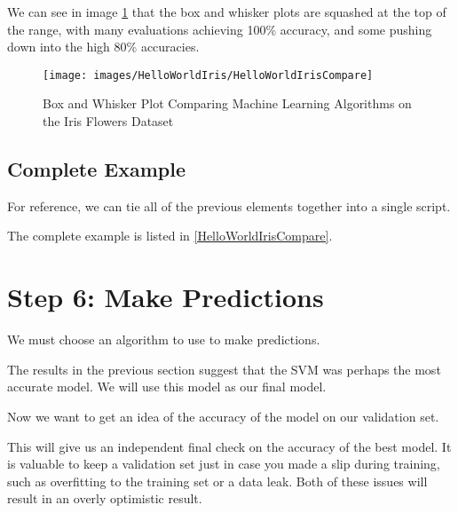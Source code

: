 We can see in image \ref{HelloWorldIrisComparePlot} that the box and whisker plots are squashed at the top of the range, with many evaluations achieving 100\% accuracy, and some pushing down into the high 80\% accuracies.
    
\begin{figure}
    \centering
    
    \texttt{[image: images/HelloWorldIris/HelloWorldIrisCompare]}
    
    \caption{Box and Whisker Plot Comparing Machine Learning Algorithms on the Iris Flowers Dataset}\label{HelloWorldIrisComparePlot}
\end{figure}    

    
\subsection{Complete Example}

For reference, we can tie all of the previous elements together into a single script.
    
The complete example is listed in \ref{HelloWorldIrisCompare}.

\begin{code}
      
    
  \caption{Example ``Hello World Iris'' - Scatter Plot Matrix} \label{HelloWorldIrisCompare}
\end{code}      
   
                

\section{Step 6: Make Predictions}

We must choose an algorithm to use to make predictions.
    
The results in the previous section suggest that the SVM was perhaps the most accurate model. We will use this model as our final model.
    
Now we want to get an idea of the accuracy of the model on our validation set.
    
This will give us an independent final check on the accuracy of the best model. It is valuable to keep a validation set just in case you made a slip during training, such as overfitting to the training set or a data leak. Both of these issues will result in an overly optimistic result.
    
